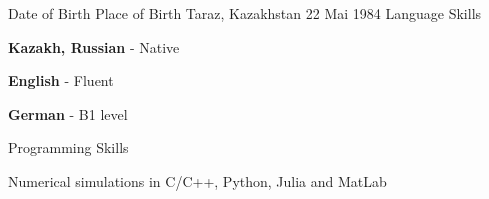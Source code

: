\begin{cventries}
  \cventry
    {Date of Birth}
    {Place of Birth}
    {Taraz, Kazakhstan}
    {22 Mai 1984}
    { }
  \cventry
    {}
    {Language Skills}
    {}
    {}
    {
      \begin{cvitems}
        \item {{\bf{Kazakh, Russian}} - Native}
        \item {{\bf{English}} - Fluent}
        \item {{\bf{German}} - B1 level}
      \end{cvitems}
    }
  \cventry
    {}
    {Programming Skills}
    {}
    {}
    { 
      \begin{cvitems}
        \item {Numerical simulations in C/C++, Python, Julia and MatLab}
      \end{cvitems}
    }
\end{cventries}

